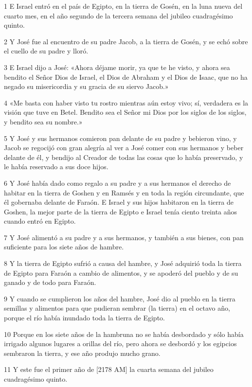 \par 1 E Israel entró en el país de Egipto, en la tierra de Gosén, en la luna nueva del cuarto mes, en el año segundo de la tercera semana del jubileo cuadragésimo quinto.
\par 2 Y José fue al encuentro de su padre Jacob, a la tierra de Gosén, y se echó sobre el cuello de su padre y lloró.
\par 3 E Israel dijo a José: «Ahora déjame morir, ya que te he visto, y ahora sea bendito el Señor Dios de Israel, el Dios de Abraham y el Dios de Isaac, que no ha negado su misericordia y su gracia de su siervo Jacob.»
\par 4 «Me basta con haber visto tu rostro mientras aún estoy vivo; sí, verdadera es la visión que tuve en Betel. Bendito sea el Señor mi Dios por los siglos de los siglos, y bendito sea su nombre.»
\par 5 Y José y sus hermanos comieron pan delante de su padre y bebieron vino, y Jacob se regocijó con gran alegría al ver a José comer con sus hermanos y beber delante de él, y bendijo al Creador de todas las cosas que lo había preservado, y le había reservado a sus doce hijos.
\par 6 Y José había dado como regalo a su padre y a sus hermanos el derecho de habitar en la tierra de Goshen y en Ramsés y en toda la región circundante, que él gobernaba delante de Faraón. E Israel y sus hijos habitaron en la tierra de Goshen, la mejor parte de la tierra de Egipto e Israel tenía ciento treinta años cuando entró en Egipto.
\par 7 Y José alimentó a su padre y a sus hermanos, y también a sus bienes, con pan suficiente para los siete años de hambre.
\par 8 Y la tierra de Egipto sufrió a causa del hambre, y José adquirió toda la tierra de Egipto para Faraón a cambio de alimentos, y se apoderó del pueblo y de su ganado y de todo para Faraón.
\par 9 Y cuando se cumplieron los años del hambre, José dio al pueblo en la tierra semillas y alimentos para que pudieran sembrar (la tierra) en el octavo año, porque el río había inundado toda la tierra de Egipto.
\par 10 Porque en los siete años de la hambruna no se había desbordado y sólo había irrigado algunos lugares a orillas del río, pero ahora se desbordó y los egipcios sembraron la tierra, y ese año produjo mucho grano.
\par 11 Y este fue el primer año de [2178 AM] la cuarta semana del jubileo cuadragésimo quinto.

